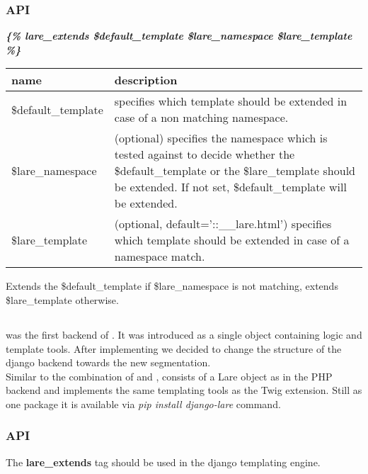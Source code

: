 \subsubsection{API}

\large{\textbf{\textit{\{\% lare\_extends \$default\_template \$lare\_namespace \$lare\_template \%\}}}}
\\
\begin{tabular}{|p{4cm}|p{8cm}|}
    \hline
    \textbf{name} & \textbf{description} \\
    \hline
    \$default\_template & specifies which template should be extended in case of a non matching namespace. \\
    \hline
    \$lare\_namespace & (optional) specifies the namespace which is tested against to decide whether the \$default\_template or the \$lare\_template should be extended. If not set, \$default\_template will be extended. \\
    \hline
    \$lare\_template & (optional, default='::\_\_lare.html') specifies which template should be extended in case of a namespace match. \\
    \hline
\end{tabular}

Extends the \$default\_template if \$lare\_namespace is not matching, extends \$lare\_template otherwise.


\subsection{\djangoLare{}}

\djangoLare{} was the first backend of \lare{}.
It was introduced as a single object containing logic and template tools.
After implementing \phpLare{} we decided to change the structure of the django backend towards the new segmentation.
\\
Similar to the combination of \phpLare{} and \twigLare{}, \djangoLare{} consists of a Lare object as in the PHP backend and implements the same templating tools as the Twig extension.
Still as one package it is available via \emph{pip install django-lare} command.


\subsubsection{API}
The \textbf{lare\_extends} tag should be used in the django templating engine.

